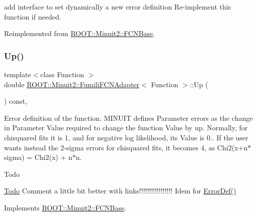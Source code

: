 add interface to set dynamically a new error definition Re-\/implement this function if needed. 

Reimplemented from \mbox{\hyperlink{classROOT_1_1Minuit2_1_1FCNBase_a840e02c2e6ef96eec289deca096b6088}{R\+O\+O\+T\+::\+Minuit2\+::\+F\+C\+N\+Base}}.

\mbox{\label{classROOT_1_1Minuit2_1_1FumiliFCNAdapter_aeed5b77f0bcca4854a9e6b0620ab3cb9}} 
\subsubsection{\texorpdfstring{Up()}{Up()}\hspace{0.1cm}{\footnotesize\ttfamily [1/2]}}
{\footnotesize\ttfamily template$<$class Function $>$ \\
double \mbox{\hyperlink{classROOT_1_1Minuit2_1_1FumiliFCNAdapter}{R\+O\+O\+T\+::\+Minuit2\+::\+Fumili\+F\+C\+N\+Adapter}}$<$ Function $>$\+::Up (\begin{DoxyParamCaption}{ }\end{DoxyParamCaption}) const\hspace{0.3cm}{\ttfamily [inline]}, {\ttfamily [virtual]}}

Error definition of the function. M\+I\+N\+U\+IT defines Parameter errors as the change in Parameter Value required to change the function Value by up. Normally, for chisquared fits it is 1, and for negative log likelihood, its Value is 0.. If the user wants instead the 2-\/sigma errors for chisquared fits, it becomes 4, as Chi2(x+n$\ast$sigma) = Chi2(x) + n$\ast$n.

\begin{DoxyRefDesc}{Todo}
\item[\mbox{\hyperlink{todo__todo000001}{Todo}}]Comment a little bit better with links!!!!!!!!!!!!!!!!! Idem for \mbox{\hyperlink{classROOT_1_1Minuit2_1_1FCNBase_ac4592475c58a65b037ba97ab5f3cba10}{Error\+Def()}}\end{DoxyRefDesc}


Implements \mbox{\hyperlink{classROOT_1_1Minuit2_1_1FCNBase_a04ef08ddad92ce8d89d498efbe021c39}{R\+O\+O\+T\+::\+Minuit2\+::\+F\+C\+N\+Base}}.

\mbox{\label{classROOT_1_1Minuit2_1_1FumiliFCNAdapter_aeed5b77f0bcca4854a9e6b0620ab3cb9}} 
